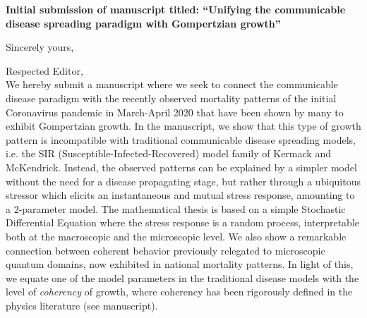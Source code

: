 \documentclass[11pt,a4paper,roman]{moderncv}
\begin{document}
\date{\today}
\opening{\textbf{Initial submission of manuscript titled: ``Unifying the communicable disease spreading paradigm with Gompertzian growth''}}
\closing{Sincerely yours, \vspace{-1em}}


\makelettertitle



Respected Editor,
\\
\vspace{1em}
We hereby submit a manuscript where we seek to connect the communicable disease paradigm with the recently observed mortality patterns of the initial Coronavirus pandemic in March-April 2020 that have been shown by many to exhibit Gompertzian growth. 
In the manuscript, we show that this type of growth pattern is incompatible with traditional communicable disease spreading models, i.e. the SIR (Susceptible-Infected-Recovered) model family of Kermack and McKendrick. Instead, the observed patterns can be explained by a simpler model without the need for a disease propagating stage, but rather through a ubiquitous stressor which elicits an instantaneous and mutual stress response, amounting to a 2-parameter model. 
The mathematical thesis is based on a simple Stochastic Differential Equation where the stress response is a random process, interpretable both at the macroscopic and the microscopic level. 
We also show a remarkable connection between coherent behavior previously relegated to microscopic quantum domains, now exhibited in national mortality patterns. In light of this, we equate one of the model parameters in the traditional disease models with the level of \emph{coherency} of growth, where coherency has been rigorously defined in the physics literature (see manuscript).
\end{document}
